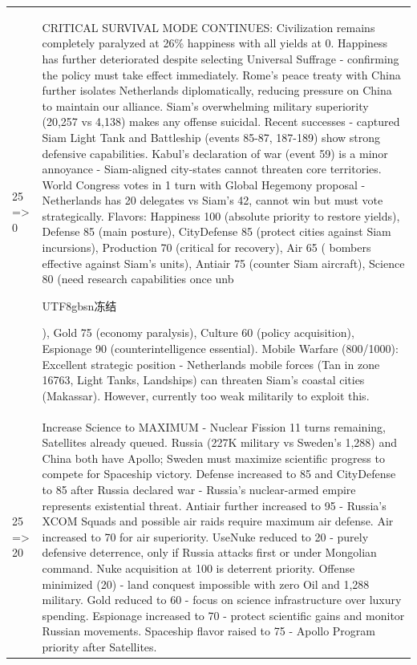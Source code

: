 \begin{longtable}{p{}p{}}
25 => 0 & CRITICAL SURVIVAL MODE CONTINUES: Civilization remains completely paralyzed at 26\% happiness with all yields at 0. Happiness has further deteriorated despite selecting Universal Suffrage - confirming the policy must take effect immediately. Rome's peace treaty with China further isolates Netherlands diplomatically, reducing pressure on China to maintain our alliance. Siam's overwhelming military superiority (20,257 vs 4,138) makes any offense suicidal. Recent successes - captured Siam Light Tank and Battleship (events 85-87, 187-189) show strong defensive capabilities. Kabul's declaration of war (event 59) is a minor annoyance - Siam-aligned city-states cannot threaten core territories. World Congress votes in 1 turn with Global Hegemony proposal - Netherlands has 20 delegates vs Siam's 42, cannot win but must vote strategically. Flavors: Happiness 100 (absolute priority to restore yields), Defense 85 (main posture), CityDefense 85 (protect cities against Siam incursions), Production 70 (critical for recovery), Air 65 ( bombers effective against Siam's units), Antiair 75 (counter Siam aircraft), Science 80 (need research capabilities once unb\begin{CJK}{UTF8}{gbsn}冻结\end{CJK}), Gold 75 (economy paralysis), Culture 60 (policy acquisition), Espionage 90 (counterintelligence essential). Mobile Warfare (800/1000): Excellent strategic position - Netherlands mobile forces (Tan in zone 16763, Light Tanks, Landships) can threaten Siam's coastal cities (Makassar). However, currently too weak militarily to exploit this. \\
25 => 20 & Increase Science to MAXIMUM - Nuclear Fission 11 turns remaining, Satellites already queued. Russia (227K military vs Sweden's 1,288) and China both have Apollo; Sweden must maximize scientific progress to compete for Spaceship victory. Defense increased to 85 and CityDefense to 85 after Russia declared war - Russia's nuclear-armed empire represents existential threat. Antiair further increased to 95 - Russia's XCOM Squads and possible air raids require maximum air defense. Air increased to 70 for air superiority. UseNuke reduced to 20 - purely defensive deterrence, only if Russia attacks first or under Mongolian command. Nuke acquisition at 100 is deterrent priority. Offense minimized (20) - land conquest impossible with zero Oil and 1,288 military. Gold reduced to 60 - focus on science infrastructure over luxury spending. Espionage increased to 70 - protect scientific gains and monitor Russian movements. Spaceship flavor raised to 75 - Apollo Program priority after Satellites. \\
\end{longtable}

